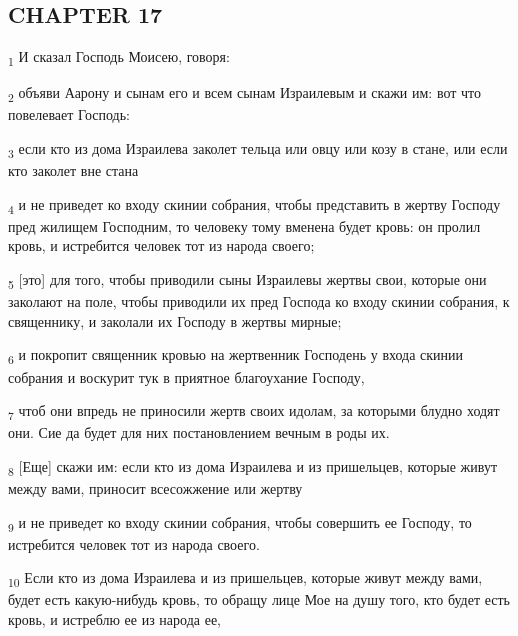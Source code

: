 \subsection{CHAPTER 17}
\begin{tcolorbox}
\textsubscript{1} И сказал Господь Моисею, говоря:
\end{tcolorbox}
\begin{tcolorbox}
\textsubscript{2} объяви Аарону и сынам его и всем сынам Израилевым и скажи им: вот что повелевает Господь:
\end{tcolorbox}
\begin{tcolorbox}
\textsubscript{3} если кто из дома Израилева заколет тельца или овцу или козу в стане, или если кто заколет вне стана
\end{tcolorbox}
\begin{tcolorbox}
\textsubscript{4} и не приведет ко входу скинии собрания, чтобы представить в жертву Господу пред жилищем Господним, то человеку тому вменена будет кровь: он пролил кровь, и истребится человек тот из народа своего;
\end{tcolorbox}
\begin{tcolorbox}
\textsubscript{5} [это] для того, чтобы приводили сыны Израилевы жертвы свои, которые они заколают на поле, чтобы приводили их пред Господа ко входу скинии собрания, к священнику, и заколали их Господу в жертвы мирные;
\end{tcolorbox}
\begin{tcolorbox}
\textsubscript{6} и покропит священник кровью на жертвенник Господень у входа скинии собрания и воскурит тук в приятное благоухание Господу,
\end{tcolorbox}
\begin{tcolorbox}
\textsubscript{7} чтоб они впредь не приносили жертв своих идолам, за которыми блудно ходят они. Сие да будет для них постановлением вечным в роды их.
\end{tcolorbox}
\begin{tcolorbox}
\textsubscript{8} [Еще] скажи им: если кто из дома Израилева и из пришельцев, которые живут между вами, приносит всесожжение или жертву
\end{tcolorbox}
\begin{tcolorbox}
\textsubscript{9} и не приведет ко входу скинии собрания, чтобы совершить ее Господу, то истребится человек тот из народа своего.
\end{tcolorbox}
\begin{tcolorbox}
\textsubscript{10} Если кто из дома Израилева и из пришельцев, которые живут между вами, будет есть какую-нибудь кровь, то обращу лице Мое на душу того, кто будет есть кровь, и истреблю ее из народа ее,
\end{tcolorbox}
